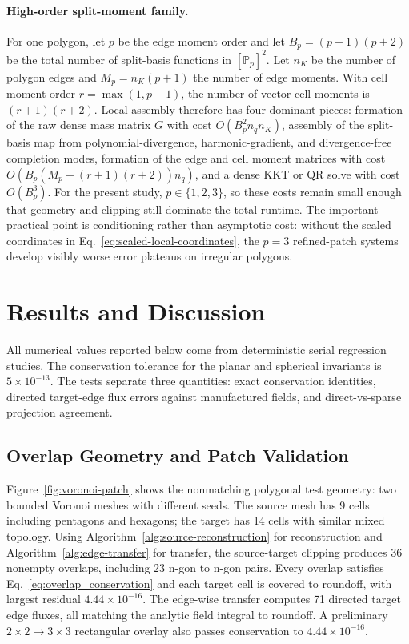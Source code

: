 \documentclass[11pt]{article}
\begin{document}
\paragraph{High-order split-moment family.}
For one polygon, let \(p\) be the edge moment order and let
\(B_p=(p+1)(p+2)\) be the total number of split-basis functions in
\([\mathbb{P}_p]^2\).  Let \(n_K\) be the number of polygon edges and
\(M_p=n_K(p+1)\) the number of edge moments.  With cell moment order
\(r=\max(1,p-1)\), the number of vector cell moments is \((r+1)(r+2)\).  Local
assembly therefore has four dominant pieces: formation of the raw dense mass
matrix \(G\) with cost \(O(B_p^2 n_q n_K)\), assembly of the split-basis map
from polynomial-divergence, harmonic-gradient, and divergence-free completion
modes, formation of the edge and cell moment matrices with cost
\(O(B_p(M_p + (r+1)(r+2)) n_q)\), and a dense KKT or QR solve with cost
\(O(B_p^3)\).  For the present study, \(p\in\{1,2,3\}\), so these costs remain
small enough that geometry and clipping still dominate the total runtime.  The
important practical point is conditioning rather than asymptotic cost: without
the scaled coordinates in Eq.~\eqref{eq:scaled-local-coordinates}, the
\(p=3\) refined-patch systems develop visibly worse error plateaus on irregular
polygons.

\section{Results and Discussion}

All numerical values reported below come from deterministic serial regression
studies.  The conservation tolerance for
the planar and spherical invariants is \(5\times10^{-13}\).  The tests separate
three quantities: exact conservation identities, directed target-edge flux
errors against manufactured fields, and direct-vs-sparse projection agreement.

\subsection{Overlap Geometry and Patch Validation}

Figure~\ref{fig:voronoi-patch} shows the nonmatching polygonal test geometry:
two bounded Voronoi meshes with different seeds.  The source mesh has 9 cells
including pentagons and hexagons; the target has 14 cells with similar mixed
topology.  Using Algorithm~\ref{alg:source-reconstruction} for reconstruction
and Algorithm~\ref{alg:edge-transfer} for transfer, the source-target clipping
produces 36 nonempty overlaps, including 23 n-gon to n-gon pairs.  Every
overlap satisfies Eq.~\eqref{eq:overlap_conservation} and each target cell is
covered to roundoff, with largest residual \(4.44\times10^{-16}\).  The
edge-wise transfer computes 71 directed target edge fluxes, all matching the
analytic field
integral to roundoff.  A preliminary \(2\times2\to3\times3\) rectangular overlay
also passes conservation to \(4.44\times10^{-16}\).
\end{document}
